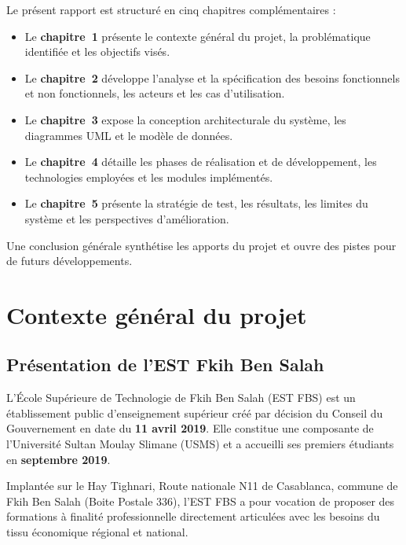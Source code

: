 \documentclass[12pt, a4paper, twoside]{report}
\begin{document}
Le présent rapport est structuré en cinq chapitres complémentaires :

\begin{itemize}
  \item Le \textbf{chapitre~1} présente le contexte général du projet, la problématique identifiée et les objectifs visés.
  \item Le \textbf{chapitre~2} développe l'analyse et la spécification des besoins fonctionnels et non fonctionnels, les acteurs et les cas d'utilisation.
  \item Le \textbf{chapitre~3} expose la conception architecturale du système, les diagrammes UML et le modèle de données.
  \item Le \textbf{chapitre~4} détaille les phases de réalisation et de développement, les technologies employées et les modules implémentés.
  \item Le \textbf{chapitre~5} présente la stratégie de test, les résultats, les limites du système et les perspectives d'amélioration.
\end{itemize}

Une conclusion générale synthétise les apports du projet et ouvre des pistes pour de futurs développements.

\cleardoublepage

\chapter{Contexte général du projet}

\section{Présentation de l'EST Fkih Ben Salah}

L'École Supérieure de Technologie de Fkih Ben Salah (EST FBS) est un établissement public d'enseignement supérieur créé par décision du Conseil du Gouvernement en date du \textbf{11 avril 2019}. Elle constitue une composante de l'Université Sultan Moulay Slimane (USMS) et a accueilli ses premiers étudiants en \textbf{septembre 2019}.

Implantée sur le Hay Tighnari, Route nationale N11 de Casablanca, commune de Fkih Ben Salah (Boite Postale 336), l'EST FBS a pour vocation de proposer des formations à finalité professionnelle directement articulées avec les besoins du tissu économique régional et national.
\end{document}
